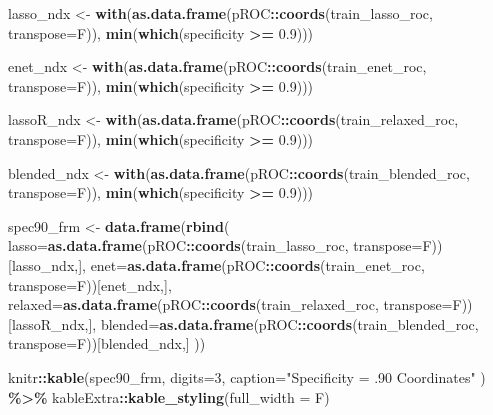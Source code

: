\documentclass[
]{book}
\newenvironment{Shaded}{\begin{snugshade}}{\end{snugshade}}
\newcommand{\DataTypeTok}[1]{\textcolor[rgb]{0.13,0.29,0.53}{#1}}
\newcommand{\DecValTok}[1]{\textcolor[rgb]{0.00,0.00,0.81}{#1}}
\newcommand{\FloatTok}[1]{\textcolor[rgb]{0.00,0.00,0.81}{#1}}
\newcommand{\KeywordTok}[1]{\textcolor[rgb]{0.13,0.29,0.53}{\textbf{#1}}}
\newcommand{\NormalTok}[1]{#1}
\newcommand{\OperatorTok}[1]{\textcolor[rgb]{0.81,0.36,0.00}{\textbf{#1}}}
\newcommand{\StringTok}[1]{\textcolor[rgb]{0.31,0.60,0.02}{#1}}
\begin{document}
\begin{Shaded}
\begin{Highlighting}[]
\NormalTok{ lasso\_ndx <{-}}\StringTok{ }\KeywordTok{with}\NormalTok{(}\KeywordTok{as.data.frame}\NormalTok{(pROC}\OperatorTok{::}\KeywordTok{coords}\NormalTok{(train\_lasso\_roc, }\DataTypeTok{transpose=}\NormalTok{F)), }
   \KeywordTok{min}\NormalTok{(}\KeywordTok{which}\NormalTok{(specificity }\OperatorTok{>=}\StringTok{ }\FloatTok{0.9}\NormalTok{)))}

\NormalTok{ enet\_ndx <{-}}\StringTok{ }\KeywordTok{with}\NormalTok{(}\KeywordTok{as.data.frame}\NormalTok{(pROC}\OperatorTok{::}\KeywordTok{coords}\NormalTok{(train\_enet\_roc, }\DataTypeTok{transpose=}\NormalTok{F)), }
   \KeywordTok{min}\NormalTok{(}\KeywordTok{which}\NormalTok{(specificity }\OperatorTok{>=}\StringTok{ }\FloatTok{0.9}\NormalTok{)))}

\NormalTok{ lassoR\_ndx <{-}}\StringTok{ }\KeywordTok{with}\NormalTok{(}\KeywordTok{as.data.frame}\NormalTok{(pROC}\OperatorTok{::}\KeywordTok{coords}\NormalTok{(train\_relaxed\_roc, }\DataTypeTok{transpose=}\NormalTok{F)), }
   \KeywordTok{min}\NormalTok{(}\KeywordTok{which}\NormalTok{(specificity }\OperatorTok{>=}\StringTok{ }\FloatTok{0.9}\NormalTok{)))}

\NormalTok{ blended\_ndx <{-}}\StringTok{ }\KeywordTok{with}\NormalTok{(}\KeywordTok{as.data.frame}\NormalTok{(pROC}\OperatorTok{::}\KeywordTok{coords}\NormalTok{(train\_blended\_roc, }\DataTypeTok{transpose=}\NormalTok{F)), }
   \KeywordTok{min}\NormalTok{(}\KeywordTok{which}\NormalTok{(specificity }\OperatorTok{>=}\StringTok{ }\FloatTok{0.9}\NormalTok{)))}

\NormalTok{  spec90\_frm <{-}}\StringTok{ }\KeywordTok{data.frame}\NormalTok{(}\KeywordTok{rbind}\NormalTok{(}
  \DataTypeTok{lasso=}\KeywordTok{as.data.frame}\NormalTok{(pROC}\OperatorTok{::}\KeywordTok{coords}\NormalTok{(train\_lasso\_roc, }\DataTypeTok{transpose=}\NormalTok{F))[lasso\_ndx,],}
  \DataTypeTok{enet=}\KeywordTok{as.data.frame}\NormalTok{(pROC}\OperatorTok{::}\KeywordTok{coords}\NormalTok{(train\_enet\_roc, }\DataTypeTok{transpose=}\NormalTok{F))[enet\_ndx,],}
  \DataTypeTok{relaxed=}\KeywordTok{as.data.frame}\NormalTok{(pROC}\OperatorTok{::}\KeywordTok{coords}\NormalTok{(train\_relaxed\_roc, }\DataTypeTok{transpose=}\NormalTok{F))[lassoR\_ndx,],}
  \DataTypeTok{blended=}\KeywordTok{as.data.frame}\NormalTok{(pROC}\OperatorTok{::}\KeywordTok{coords}\NormalTok{(train\_blended\_roc, }\DataTypeTok{transpose=}\NormalTok{F))[blended\_ndx,]}
\NormalTok{ ))}


\NormalTok{knitr}\OperatorTok{::}\KeywordTok{kable}\NormalTok{(spec90\_frm,}
  \DataTypeTok{digits=}\DecValTok{3}\NormalTok{,}
  \DataTypeTok{caption=}\StringTok{"Specificity = .90 Coordinates"}
\NormalTok{) }\OperatorTok{\%>\%}
\StringTok{  }\NormalTok{kableExtra}\OperatorTok{::}\KeywordTok{kable\_styling}\NormalTok{(}\DataTypeTok{full\_width =}\NormalTok{ F)}
\end{Highlighting}
\end{Shaded}
\end{document}
